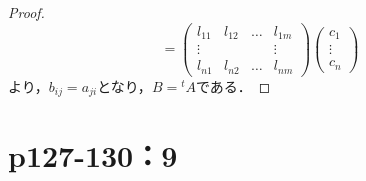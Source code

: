 \documentclass[a4paper,10pt,fleqn]{ltjsarticle}
\begin{document}
\begin{tleftbar}
\begin{proof}
\[            =
            \begin{pmatrix} l_{11} & l_{12} & \dots & l_{1m} \\ \vdots & & & \vdots \\ l_{n1} & l_{n2} & \dots & l_{nm} \end{pmatrix}
            \begin{pmatrix} c_1 \\ \vdots \\ c_n \end{pmatrix}
        \]
        より，$b_{ij}=a_{ji}$となり，$B= {}^t A$である．
    \end{proof}
\end{tleftbar}

\newpage

\section*{p127-130：9}
\end{document}
